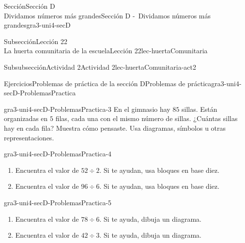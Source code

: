 \begin{sectionptx}{Sección}{{\Large Sección D\\}Dividamos números más grandes}{}{Sección D -~Dividamos números más grandes}{}{}{gra3-uni4-secD}
\begin{subsectionptx}{Subsección}{{\normalsize Lección 22\\[-0.05cm]}La huerta comunitaria de la escuela}{}{Lección 22}{}{}{lec-huertaComunitaria}
\begin{subsubsectionptx}{Subsubsección}{Actividad 2}{}{Actividad 2}{}{}{lec-huertaComunitaria-act2}
\end{subsubsectionptx}
\end{subsectionptx}
%
%
\typeout{************************************************}
\typeout{************************************************}
%
\begin{exercises-subsection}{Ejercicios}{Problemas de práctica de la sección D}{}{Problemas de práctica}{}{}{gra3-uni4-secD-ProblemasPractica}
\begin{divisionexercise}{1}{}{}{gra3-uni4-secD-ProblemasPractica-3}%
En el gimnasio hay \(85\) sillas. Están organizadas en \(5\) filas, cada una con el mismo número de sillas. ¿Cuántas sillas hay en cada fila? Muestra cómo pensaste. Usa diagramas, símbolos u otras representaciones.%
\end{divisionexercise}%
\begin{divisionexercise}{2}{}{}{gra3-uni4-secD-ProblemasPractica-4}%
%
\begin{enumerate}[label={(\alph*)}]
\item{}Encuentra el valor de \(52 \div 2\). Si te ayudan, usa bloques en base diez.%
\item{}Encuentra el valor de \(96 \div 6\). Si te ayudan, usa bloques en base diez.%
\end{enumerate}
\end{divisionexercise}%
\begin{divisionexercise}{3}{}{}{gra3-uni4-secD-ProblemasPractica-5}%
%
\begin{enumerate}[label={(\alph*)}]
\item{}Encuentra el valor de \(78 \div 6\). Si te ayuda, dibuja un diagrama.%
\item{}Encuentra el valor de \(42 \div 3\). Si te ayuda, dibuja un diagrama.%

\end{enumerate}
\end{divisionexercise}
\end{exercises-subsection}
\end{sectionptx}
